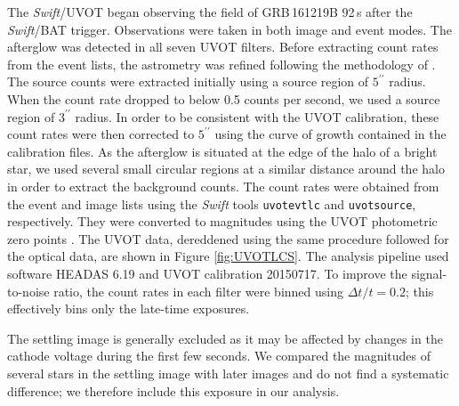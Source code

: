 \documentclass[fleqn,usenatbib]{mnras}
\begin{document}
The {\it Swift}/UVOT began observing the field of GRB\,161219B 92\,s after the {\it Swift}/BAT trigger.  Observations were taken in both image and event modes. The afterglow
was detected in all seven UVOT filters.   Before extracting count rates 
from the event lists, the astrometry was refined following the methodology of 
\citet{Oates09}. The source counts were extracted initially using a source region of $5^{\prime\prime}$
radius. When the count rate dropped to below 0.5 counts per second, we used a source 
region of $3^{\prime\prime}$ radius. In order to be consistent with the UVOT calibration, these count 
rates were then corrected to  $5^{\prime\prime}$ using the curve of growth contained in the calibration files. 
As the afterglow is situated at the edge of the halo of a bright star, we used several small circular
regions at a similar distance around the halo in order to extract the background counts. The
count rates were obtained from the event and image lists using the {\it Swift} tools
{\tt uvotevtlc} and {\tt uvotsource}, respectively. They were converted to magnitudes
using the UVOT photometric zero points \citep{Poole08,Breeveld11}. The UVOT data, dereddened using the same procedure followed for the optical data, are shown in Figure \ref{fig:UVOTLCS}. The analysis pipeline used software HEADAS 6.19 and UVOT calibration
20150717. To improve the signal-to-noise ratio, the count rates in each filter were binned using
$\Delta t/t = 0.2$; this effectively bins only the late-time exposures.

The settling image is generally excluded as it may be affected by changes in the cathode voltage
during the first few seconds. We compared the magnitudes of several stars in the settling image
with later images and do not find a systematic difference; we therefore include this exposure
in our analysis. 
\end{document}
